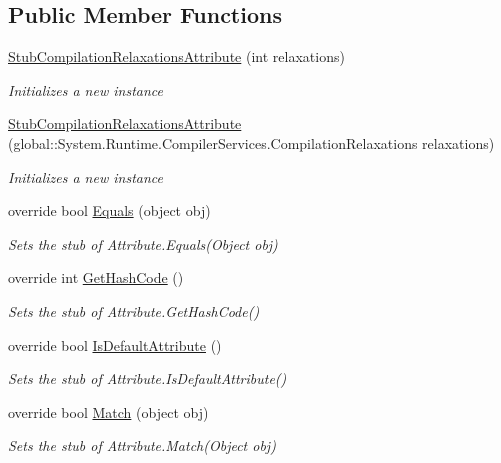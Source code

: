 \subsection*{Public Member Functions}
\begin{DoxyCompactItemize}
\item 
\hyperlink{class_system_1_1_runtime_1_1_compiler_services_1_1_fakes_1_1_stub_compilation_relaxations_attribute_a4dbd0b3ed9be627aedb0ccf17fafd3eb}{Stub\-Compilation\-Relaxations\-Attribute} (int relaxations)
\begin{DoxyCompactList}\small\item\em Initializes a new instance\end{DoxyCompactList}\item 
\hyperlink{class_system_1_1_runtime_1_1_compiler_services_1_1_fakes_1_1_stub_compilation_relaxations_attribute_a64278c68e0e9b43a86fe3dbecb1faf84}{Stub\-Compilation\-Relaxations\-Attribute} (global\-::\-System.\-Runtime.\-Compiler\-Services.\-Compilation\-Relaxations relaxations)
\begin{DoxyCompactList}\small\item\em Initializes a new instance\end{DoxyCompactList}\item 
override bool \hyperlink{class_system_1_1_runtime_1_1_compiler_services_1_1_fakes_1_1_stub_compilation_relaxations_attribute_a5961a34f128e4b02c38df0c0872518f9}{Equals} (object obj)
\begin{DoxyCompactList}\small\item\em Sets the stub of Attribute.\-Equals(\-Object obj)\end{DoxyCompactList}\item 
override int \hyperlink{class_system_1_1_runtime_1_1_compiler_services_1_1_fakes_1_1_stub_compilation_relaxations_attribute_a1515a6f9ebae3938fed34006816382d9}{Get\-Hash\-Code} ()
\begin{DoxyCompactList}\small\item\em Sets the stub of Attribute.\-Get\-Hash\-Code()\end{DoxyCompactList}\item 
override bool \hyperlink{class_system_1_1_runtime_1_1_compiler_services_1_1_fakes_1_1_stub_compilation_relaxations_attribute_a761215c653022c657ed3314110eed0cd}{Is\-Default\-Attribute} ()
\begin{DoxyCompactList}\small\item\em Sets the stub of Attribute.\-Is\-Default\-Attribute()\end{DoxyCompactList}\item 
override bool \hyperlink{class_system_1_1_runtime_1_1_compiler_services_1_1_fakes_1_1_stub_compilation_relaxations_attribute_a88d60bfb5bddcf6ba2bcf5a9483f5b59}{Match} (object obj)
\begin{DoxyCompactList}\small\item\em Sets the stub of Attribute.\-Match(\-Object obj)\end{DoxyCompactList}\end{DoxyCompactItemize}
